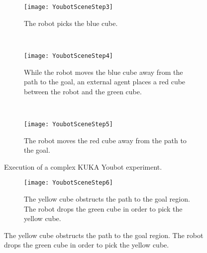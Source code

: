 {\begin{figure}[h]
\centering
        \begin{subfigure}[b]{1\columnwidth}
                \centering
                \texttt{[image: YoubotSceneStep3]}
                \caption{The robot picks the blue cube.}
                 \label{planning:DSI.fig.youbotstep3}  
        \end{subfigure}   
        ~            
        \begin{subfigure}[b]{1\columnwidth}
                \centering
                \texttt{[image: YoubotSceneStep4]}
                \caption{While the robot moves the blue cube away from the path to the goal, an external agent places a red cube between the robot and the green cube.}
                 \label{planning:DSI.fig.youbotstep4}  
        \end{subfigure} 
~

\centering

      \begin{subfigure}[b]{1\columnwidth}
                \centering
                \texttt{[image: YoubotSceneStep5]}
                \caption{The robot moves the red cube away from the path to the goal.  }
                 \label{planning:DSI.fig.youbotstep5}  
        \end{subfigure}         
              \caption{Execution of a complex KUKA Youbot experiment.}
        \label{planning:DSI.fig.youscreen2}
\end{figure}
        \begin{figure}[h]
              \begin{subfigure}[b]{1\columnwidth}
                \centering
                \texttt{[image: YoubotSceneStep6]}
                \caption{The yellow cube obstructs the path to the goal region. The robot drops the green cube in order to pick the yellow cube.}
                 \label{planning:DSI.fig.youbotstep6}  
        \end{subfigure} 


\end{figure}}
